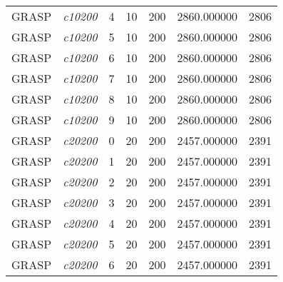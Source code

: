 {\begin{longtable}{cc|c|cc|cc}
			GRASP              & \textit{c10200}    & 4                               & 10               & 200              & 2860.000000                          & 2806 \\ 
			GRASP              & \textit{c10200}    & 5                               & 10               & 200              & 2860.000000                          & 2806 \\ 
			GRASP              & \textit{c10200}    & 6                               & 10               & 200              & 2860.000000                          & 2806 \\ 
			GRASP              & \textit{c10200}    & 7                               & 10               & 200              & 2860.000000                          & 2806 \\ 
			GRASP              & \textit{c10200}    & 8                               & 10               & 200              & 2860.000000                          & 2806 \\ 
			GRASP              & \textit{c10200}    & 9                               & 10               & 200              & 2860.000000                          & 2806 \\ \hline
			GRASP              & \textit{c20200}    & 0                               & 20               & 200              & 2457.000000                          & 2391 \\ 
			GRASP              & \textit{c20200}    & 1                               & 20               & 200              & 2457.000000                          & 2391 \\ 
			GRASP              & \textit{c20200}    & 2                               & 20               & 200              & 2457.000000                          & 2391 \\ 
			GRASP              & \textit{c20200}    & 3                               & 20               & 200              & 2457.000000                          & 2391 \\ 
			GRASP              & \textit{c20200}    & 4                               & 20               & 200              & 2457.000000                          & 2391 \\ 
			GRASP              & \textit{c20200}    & 5                               & 20               & 200              & 2457.000000                          & 2391 \\ 
			GRASP              & \textit{c20200}    & 6                               & 20               & 200              & 2457.000000                          & 2391 \\ 

\end{longtable}}
